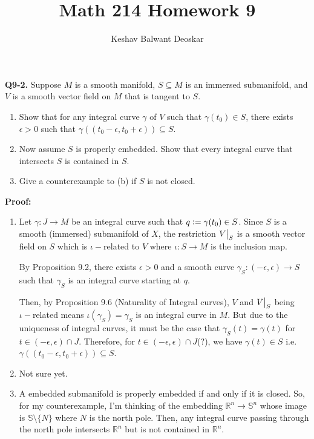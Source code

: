 \documentclass{article}
\title{Math 214 Homework 9}
\author{Keshav Balwant Deoskar}
\newcommand{\R}{\mathbb{R}}
\newcommand{\defeq}{\vcentcolon=}
\newcommand{\restr}[2]{{%
  \left.\kern-\nulldelimiterspace %
  #1 %
  \vphantom{\big|} %
  \right|_{#2} %
  }}
\begin{document}
\maketitle


\textbf{Q9-2.} Suppose $M$ is a smooth manifold, $S \subseteq M$ is an immersed submanifold, and $V$ is a smooth vector field on $M$ that is tangent to $S$.
\begin{enumerate}[label=(\alph*)]
  \item Show that for any integral curve $\gamma$ of $V$ such that $\gamma(t_0) \in S$, there exists $\epsilon > 0$ such that $\gamma \left(\left(t_0 - \epsilon, t_0 + \epsilon\right)\right) \subseteq S$.
  \item Now assume $S$ is properly embedded. Show that every integral curve that intersects $S$ is contained in $S$.
  \item Give a counterexample to (b) if $S$ is not closed.
\end{enumerate}

\vskip 0.5cm
\textbf{Proof:}

\begin{enumerate}[label=(\alph*)]
  \item Let $\gamma : J \rightarrow M$ be an integral curve such that $q \defeq \gamma(t_0) \in S$. Since $S$ is a smooth (immersed) submanifold of $X$, the restriction $\restr{V}{S}$ is a smooth vector field on $S$ which is $\iota-$related to $V$ where $\iota : S \rightarrow M$ is the inclusion map. 
  
  By Proposition 9.2, there exists $\epsilon > 0$ and a smooth curve $\gamma_S : (-\epsilon, \epsilon) \rightarrow S$ such that $\gamma_S$ is an integral curve starting at $q$.

  Then, by Proposition 9.6 (Naturality of Integral curves), $V$ and $\restr{V}{S}$ being $\iota-$related means $\iota\left(\gamma_S\right) = \gamma_S$ is an integral curve in $M$. But due to the uniqueness of integral curves, it must be the case that $\gamma_S(t) = \gamma(t)$ for $t \in (-\epsilon, \epsilon) \cap J$. Therefore, for $t \in (-\epsilon, \epsilon) \cap J$(?), we have $\gamma(t) \in S$ i.e. $\gamma \left((t_0 - \epsilon, t_0 + \epsilon)\right) \subseteq S$.

  \vskip 1cm
  \item Not sure yet.
  
  \vskip 1cm
  \item A embedded submanifold is properly embedded if and only if it is closed. So, for my counterexample, I'm thinking of the embedding $\R^n \rightarrow \mathbb{S}^n$
  whose image is $\mathbb{S} \setminus \{N\}$ where $N$ is the north pole. Then, any integral curve passing through the north pole intersects $\R^n$ but is not contained in $\R^n$.
\end{enumerate}
\end{document}
